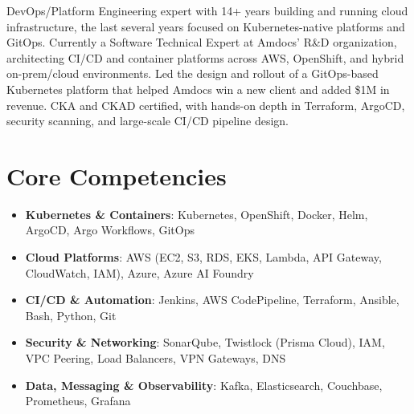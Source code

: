 \documentclass[11pt,a4paper,sans]{moderncv}
\begin{document}
\makecvtitle


\vspace{6pt}
\small{DevOps/Platform Engineering expert with 14+ years building and running cloud infrastructure, the last several years focused on Kubernetes-native platforms and GitOps. Currently a Software Technical Expert at Amdocs' R\&D organization, architecting CI/CD and container platforms across AWS, OpenShift, and hybrid on-prem/cloud environments. Led the design and rollout of a GitOps-based Kubernetes platform that helped Amdocs win a new client and added \$1M in revenue. CKA and CKAD certified, with hands-on depth in Terraform, ArgoCD, security scanning, and large-scale CI/CD pipeline design.}


\section{Core Competencies}
\vspace{1pt}
\begin{itemize}

\item \textbf{Kubernetes \& Containers}: Kubernetes, OpenShift, Docker, Helm, ArgoCD, Argo Workflows, GitOps

\item \textbf{Cloud Platforms}: AWS (EC2, S3, RDS, EKS, Lambda, API Gateway, CloudWatch, IAM), Azure, Azure AI Foundry

\item \textbf{CI/CD \& Automation}: Jenkins, AWS CodePipeline, Terraform, Ansible, Bash, Python, Git

\item \textbf{Security \& Networking}: SonarQube, Twistlock (Prisma Cloud), IAM, VPC Peering, Load Balancers, VPN Gateways, DNS

\item \textbf{Data, Messaging \& Observability}: Kafka, Elasticsearch, Couchbase, Prometheus, Grafana

\end{itemize}

\end{document}
